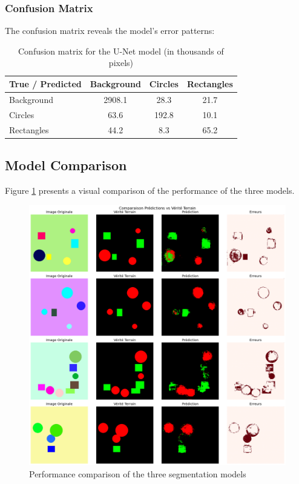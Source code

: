 \documentclass[12pt,a4paper]{article}
\begin{document}
\subsubsection{Confusion Matrix}

The confusion matrix reveals the model's error patterns:

\begin{table}[H]
\centering
\caption{Confusion matrix for the U-Net model (in thousands of pixels)}
\label{tab:confusion_matrix}
\begin{tabular}{@{}l|ccc@{}}
\toprule
\textbf{True / Predicted} & \textbf{Background} & \textbf{Circles} & \textbf{Rectangles} \\
\midrule
Background & 2908.1 & 28.3 & 21.7 \\
Circles & 63.6 & 192.8 & 10.1 \\
Rectangles & 44.2 & 8.3 & 65.2 \\
\bottomrule
\end{tabular}
\end{table}

\subsection{Model Comparison}

Figure \ref{fig:model_comparison_chart} presents a visual comparison of the performance of the three models.

\begin{figure}[H]
    \centering
    \includegraphics[width=\textwidth]{img_tp1/cell_18_output_01_image_08.png}
    \caption{Performance comparison of the three segmentation models}
    \label{fig:model_comparison_chart}
\end{figure}
\end{document}
